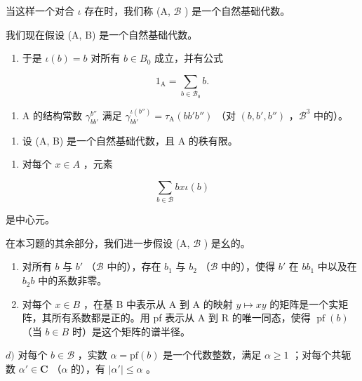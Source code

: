 当这样一个对合 \(\iota\) 存在时，我们称 (A, \(\mathcal{B}\) ) 是一个自然基础代数。

我们现在假设 (A, B) 是一个自然基础代数。

\begin{enumerate}
\def\labelenumi{\alph{enumi})}
\setcounter{enumi}{1}
\tightlist
\item
  于是 \(\iota(b) = b\) 对所有 \(b \in B_{0}\) 成立，并有公式
\end{enumerate}

\[
1 _ {\mathrm{A}} = \sum_ {b \in \mathcal {B} _ {0}} b.
\]

\begin{enumerate}
\def\labelenumi{\alph{enumi})}
\setcounter{enumi}{2}
\tightlist
\item
  A 的结构常数 \(\gamma_{bb'}^{b''}\) 满足 \(\gamma_{bb'}^{\iota(b'')} = \tau_{\mathrm{A}}(bb'b'')\) （对 \((b, b', b'')\) ，\(\mathcal{B}^{3}\) 中的）。
\end{enumerate}

\begin{enumerate}
\def\labelenumi{\arabic{enumi})}
\setcounter{enumi}{7}
\tightlist
\item
  设 (A, B) 是一个自然基础代数，且 A 的秩有限。
\end{enumerate}

\begin{enumerate}
\def\labelenumi{\alph{enumi})}
\tightlist
\item
  对每个 \(x \in A\) ，元素
\end{enumerate}

\[
\sum_ {b \in \mathcal {B}} b x \iota (b)
\]

是中心元。

在本习题的其余部分，我们进一步假设 (A, \(\mathcal{B}\) ) 是幺的。

\begin{enumerate}
\def\labelenumi{\alph{enumi})}
\setcounter{enumi}{1}
\item
  对所有 \(b\) 与 \(b'\) （\(\mathcal{B}\) 中的），存在 \(b_1\) 与 \(b_2\) （\(\mathcal{B}\) 中的），使得 \(b'\) 在 \(bb_1\) 中以及在 \(b_2b\) 中的系数非零。
\item
  对每个 \(x \in B\) ，在基 B 中表示从 A 到 A 的映射 \(y \mapsto xy\) 的矩阵是一个实矩阵，其所有系数都是正的。用 pf 表示从 A 到 R 的唯一同态，使得 \(\operatorname{pf}(b)\) （当 \(b \in B\) 时）是这个矩阵的谱半径。
\end{enumerate}

\(d)\) 对每个 \(b \in \mathcal{B}\) ，实数 \(\alpha = \mathrm{pf}(b)\) 是一个代数整数，满足 \(\alpha \geqslant 1\) ；对每个共轭数 \(\alpha' \in \mathbf{C}\) （\(\alpha\) 的），有 \(|\alpha'| \leqslant \alpha\) 。

